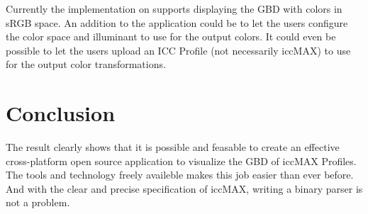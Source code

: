 Currently the implementation on supports displaying the GBD with colors in sRGB space.
An addition to the application could be to let the users configure the color space and illuminant to use for the output colors.
It could even be possible to let the users upload an ICC Profile (not necessarily iccMAX) to use for the output color transformations.

\section{Conclusion}
The result clearly shows that it is possible and feasable to create an effective cross-platform open source application to visualize the GBD of iccMAX Profiles.
The tools and technology freely availeble makes this job easier than ever before.
And with the clear and precise specification of iccMAX, writing a binary parser is not a problem.

